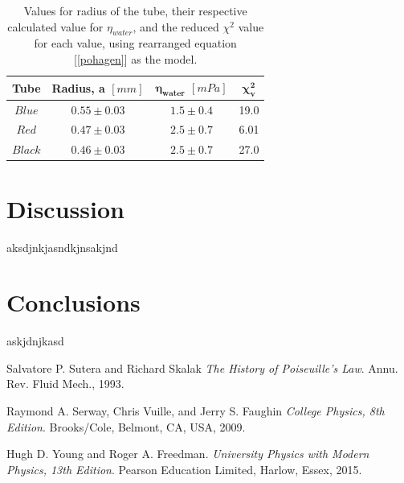 \documentclass[twocolumn]{revtex4}
\begin{document}
\begin{table}[h!]
\centering
\begin{tabular}{ |c|c|c|c| } 
 \hline
 \textbf{Tube} & \textbf{Radius, a $[mm]$} & \textbf{$\boldsymbol{\eta_{water}}$ $[mPa]$} & \textbf{$\boldsymbol{\chi^2_v}$}\\ [0.5ex] 
 \hline\hline
 $Blue$ &$0.55\pm0.03$ & $1.5\pm0.4$ & 19.0\\ 
 $Red$ & $0.47\pm0.03$ & $2.5\pm0.7$ & 6.01\\
 $Black$ & $0.46\pm0.03$ & $2.5\pm0.7$ & 27.0\\
 
 \hline
\end{tabular}
\caption{Values for radius of the tube, their respective calculated value for $\eta_{water}$, and the reduced $\chi^2$ value for each value, using rearranged equation [\ref{pohagen}] as the model. }
\label{table:1}
\end{table}

\vspace{-3ex}
\section{Discussion}
\vspace{-2ex}

aksdjnkjasndkjnsakjnd


\vspace{-5ex}
\section{Conclusions}
\vspace{-2ex}
 
askjdnjkasd

\begin{thebibliography}{5}
	Salvatore P. Sutera and Richard Skalak
	\textit{The History of Poiseuille's Law}.
	Annu. Rev. Fluid Mech., 1993.
	
	Raymond A. Serway, Chris Vuille, and Jerry S. Faughin
	\textit{College Physics, 8th Edition}.
	Brooks/Cole, Belmont, CA, USA, 2009.

	Hugh D. Young and Roger A. Freedman.
	\textit{University Physics with Modern Physics, 13th Edition}. 
	Pearson Education Limited, Harlow, Essex, 2015.
	
\end{thebibliography}
\clearpage

\vfill
\twocolumngrid
\vspace{-3ex}
\end{document}
